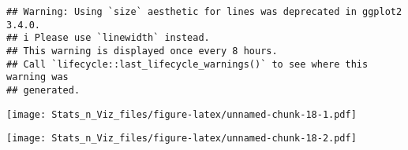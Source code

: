 \documentclass[
]{article}
\newenvironment{Shaded}{\begin{snugshade}}{\end{snugshade}}
\newcommand{\AttributeTok}[1]{\textcolor[rgb]{0.77,0.63,0.00}{#1}}
\newcommand{\CommentTok}[1]{\textcolor[rgb]{0.56,0.35,0.01}{\textit{#1}}}
\newcommand{\DecValTok}[1]{\textcolor[rgb]{0.00,0.00,0.81}{#1}}
\newcommand{\FloatTok}[1]{\textcolor[rgb]{0.00,0.00,0.81}{#1}}
\newcommand{\FunctionTok}[1]{\textcolor[rgb]{0.00,0.00,0.00}{#1}}
\newcommand{\NormalTok}[1]{#1}
\newcommand{\SpecialCharTok}[1]{\textcolor[rgb]{0.00,0.00,0.00}{#1}}
\newcommand{\StringTok}[1]{\textcolor[rgb]{0.31,0.60,0.02}{#1}}
\begin{document}
\begin{verbatim}
## Warning: Using `size` aesthetic for lines was deprecated in ggplot2 3.4.0.
## i Please use `linewidth` instead.
## This warning is displayed once every 8 hours.
## Call `lifecycle::last_lifecycle_warnings()` to see where this warning was
## generated.
\end{verbatim}

\texttt{[image: Stats\_n\_Viz\_files/figure-latex/unnamed-chunk-18-1.pdf]}

\begin{Shaded}
\end{Shaded}

\texttt{[image: Stats\_n\_Viz\_files/figure-latex/unnamed-chunk-18-2.pdf]}
\end{document}
